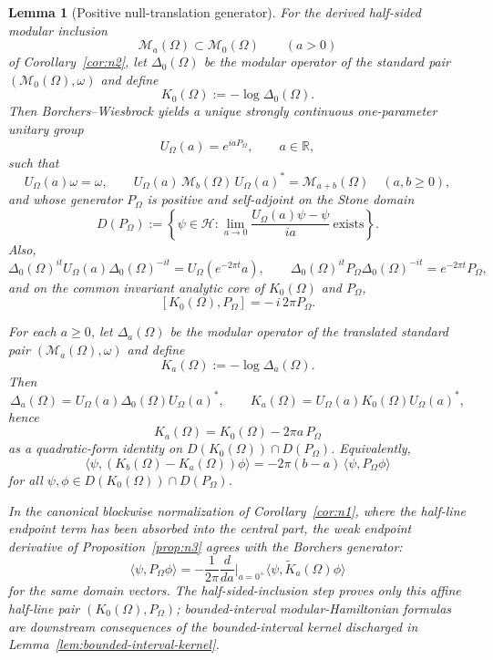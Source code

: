 \documentclass[11pt]{article}
\newtheorem{lemma}[theorem]{Lemma}
\begin{document}
\begin{lemma}[Positive null-translation generator]\label{lem:translation}
For the derived half-sided modular inclusion
\[
\mathcal M_a(\Omega)\subset \mathcal M_0(\Omega)
\qquad (a>0)
\]
of Corollary~\ref{cor:n2}, let \(\Delta_0(\Omega)\) be the modular operator of the standard pair \((\mathcal M_0(\Omega),\omega)\) and define
\[
K_0(\Omega):=-\log \Delta_0(\Omega).
\]
Then Borchers--Wiesbrock yields a unique strongly continuous one-parameter unitary group
\[
U_\Omega(a)=e^{iaP_\Omega},
\qquad a\in\mathbb R,
\]
such that
\[
U_\Omega(a)\omega=\omega,
\qquad
U_\Omega(a)\,\mathcal M_b(\Omega)\,U_\Omega(a)^*=\mathcal M_{a+b}(\Omega)
\quad (a,b\ge 0),
\]
and whose generator \(P_\Omega\) is positive and self-adjoint on the Stone domain
\[
D(P_\Omega)
:=
\left\{
\psi\in\mathcal H:
\lim_{a\to 0}\frac{U_\Omega(a)\psi-\psi}{ia}\ \text{exists}
\right\}.
\]
Also,
\[
\Delta_0(\Omega)^{it}U_\Omega(a)\Delta_0(\Omega)^{-it}
=
U_\Omega(e^{-2\pi t}a),
\qquad
\Delta_0(\Omega)^{it}P_\Omega\Delta_0(\Omega)^{-it}
=
e^{-2\pi t}P_\Omega,
\]
and on the common invariant analytic core of \(K_0(\Omega)\) and \(P_\Omega\),
\[
[K_0(\Omega),P_\Omega]=-\,i\,2\pi P_\Omega.
\]

For each \(a\ge 0\), let \(\Delta_a(\Omega)\) be the modular operator of the translated standard pair \((\mathcal M_a(\Omega),\omega)\) and define
\[
K_a(\Omega):=-\log \Delta_a(\Omega).
\]
Then
\[
\Delta_a(\Omega)=U_\Omega(a)\Delta_0(\Omega)U_\Omega(a)^*,
\qquad
K_a(\Omega)=U_\Omega(a)K_0(\Omega)U_\Omega(a)^*,
\]
hence
\[
K_a(\Omega)=K_0(\Omega)-2\pi a\,P_\Omega
\]
as a quadratic-form identity on \(D(K_0(\Omega))\cap D(P_\Omega)\). Equivalently,
\[
\langle\psi,(K_b(\Omega)-K_a(\Omega))\phi\rangle
=
-2\pi(b-a)\,\langle\psi,P_\Omega\phi\rangle
\]
for all \(\psi,\phi\in D(K_0(\Omega))\cap D(P_\Omega)\).

In the canonical blockwise normalization of Corollary~\ref{cor:n1}, where the half-line endpoint term has been absorbed into the central part, the weak endpoint derivative of Proposition~\ref{prop:n3} agrees with the Borchers generator:
\[
\langle\psi,P_\Omega\phi\rangle
=
-\frac{1}{2\pi}\frac{d}{da}\Big|_{a=0^+}
\langle\psi,\widetilde K_a(\Omega)\phi\rangle
\]
for the same domain vectors. The half-sided-inclusion step proves only this affine half-line pair \((K_0(\Omega),P_\Omega)\); bounded-interval modular-Hamiltonian formulas are downstream consequences of the bounded-interval kernel discharged in Lemma~\ref{lem:bounded-interval-kernel}.
\end{lemma}
\end{document}
